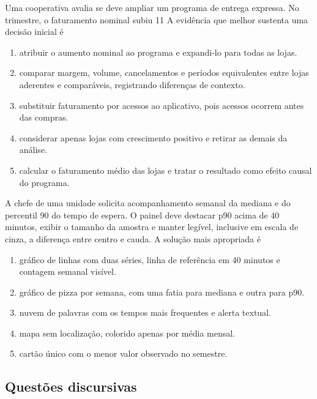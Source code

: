 \TextoBase Uma cooperativa avalia se deve ampliar um programa de entrega expressa. No trimestre, o faturamento nominal subiu 11%
\FonteDidatica
\Comando A evidência que melhor sustenta uma decisão inicial é
\begin{enumerate}[label=\Alph*)]
\item atribuir o aumento nominal ao programa e expandi-lo para todas as lojas.
\item comparar margem, volume, cancelamentos e períodos equivalentes entre lojas aderentes e comparáveis, registrando diferenças de contexto.
\item substituir faturamento por acessos ao aplicativo, pois acessos ocorrem antes das compras.
\item considerar apenas lojas com crescimento positivo e retirar as demais da análise.
\item calcular o faturamento médio das lojas e tratar o resultado como efeito causal do programa.
\end{enumerate}
\TextoBase A chefe de uma unidade solicita acompanhamento semanal da mediana e do percentil 90 do tempo de espera. O painel deve destacar p90 acima de 40 minutos, exibir o tamanho da amostra e manter legível, inclusive em escala de cinza, a diferença entre centro e cauda.
\FonteDidatica
\Comando A solução mais apropriada é
\begin{enumerate}[label=\Alph*)]
\item gráfico de linhas com duas séries, linha de referência em 40 minutos e contagem semanal visível.
\item gráfico de pizza por semana, com uma fatia para mediana e outra para p90.
\item nuvem de palavras com os tempos mais frequentes e alerta textual.
\item mapa sem localização, colorido apenas por média mensal.
\item cartão único com o menor valor observado no semestre.
\end{enumerate}

\subsection{Questões discursivas}

